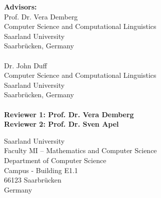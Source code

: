 \pagestyle{empty}

\vspace*{0.5cm}
\textbf{Advisors:}\\
Prof. Dr. Vera Demberg\\
Computer Science and Computational Linguistics\\
Saarland University\\
Saarbrücken, Germany\\\\

Dr. John Duff\\
Computer Science and Computational Linguistics\\
Saarland University\\
Saarbrücken, Germany\\\\


\vspace*{2.5cm}
\textbf{Reviewer 1: Prof. Dr. Vera Demberg}\\
\textbf{Reviewer 2: Prof. Dr. Sven Apel}\\


\vspace{4.5cm}


\vspace{3cm}
Saarland University\\
Faculty MI – Mathematics and Computer Science\\
Department of Computer Science\\
Campus - Building E1.1\\
66123 Saarbrücken\\
Germany\\


